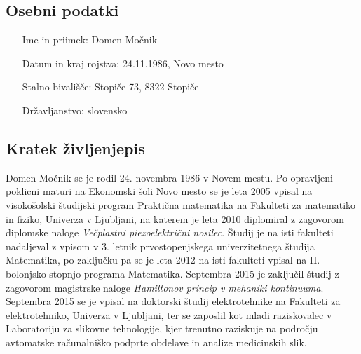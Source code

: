 \documentclass[a4paper,twoside,11pt]{article}
\begin{document}
	\subsection*{Osebni podatki}
	\begin{itemize}[align=left, itemsep=-0.1cm, leftmargin=4.25cm, labelwidth=*]
		\item[Ime in priimek:] Domen Močnik
		\item[Datum in kraj rojstva:] 24.11.1986, Novo mesto
		\item[Stalno bivališče:] Stopiče 73, 8322 Stopiče
		\item[Državljanstvo:] slovensko
	\end{itemize}
	
	\subsection*{Kratek življenjepis}
	\par{
		Domen Močnik se je rodil 24. novembra 1986 v Novem mestu. Po opravljeni poklicni maturi na Ekonomski šoli Novo mesto se je leta 2005 vpisal na visokošolski študijski program Praktična matematika na Fakulteti za matematiko in fiziko, Univerza v Ljubljani, na katerem je leta 2010 diplomiral z zagovorom diplomske naloge \textit{Večplastni piezoelektrični nosilec}. Študij je na isti fakulteti nadaljeval z vpisom v 3. letnik prvostopenjskega univerzitetnega študija Matematika, po zaključku pa se je leta 2012 na isti fakulteti vpisal na II. bolonjsko stopnjo programa Matematika. Septembra 2015 je zaključil študij z zagovorom magistrske naloge \textit{Hamiltonov princip v mehaniki kontinuuma}. Septembra 2015 se je vpisal na doktorski študij elektrotehnike na Fakulteti za elektrotehniko, Univerza v Ljubljani, ter se zaposlil kot mladi raziskovalec v Laboratoriju za slikovne tehnologije, kjer trenutno raziskuje na področju avtomatske računalniško podprte obdelave in analize medicinskih slik.
	}
	
\end{document}

